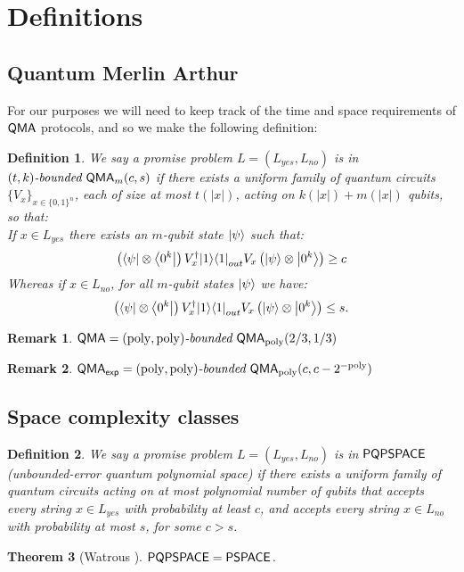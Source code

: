 \documentclass[11pt]{article}
\newtheorem{theorem}{Theorem}
\newtheorem{definition}{Definition}
\newtheorem{remark}[theorem]{Remark}
\theoremstyle{definition}
\theoremstyle{remark}
\newcommand\QMA{{\sf{QMA}}}
\newcommand\PSPACE{{\sf{PSPACE}}}
\newcommand\QMAexp{{\sf{QMA}_{exp}}}
\newcommand\bddQMA[5]{{\left(#1,#2\right)}\textit{-bounded }\QMA_{#3}(#4,#5)}
\newcommand\PQPSPACE{{\sf{PQPSPACE}}}
\newcommand{\poly}{\mathrm{poly}}
\begin{document}
\section{Definitions}

\subsection{Quantum Merlin Arthur}\label{def:qma}
For our purposes we will need to keep track of the time and space requirements of $\QMA$ protocols, and so we make the following definition:
\begin{definition}We say a promise problem $L=(L_{yes},L_{no})$ is in $\bddQMA{t}{k}{m}{c}{s}$ if there exists a uniform family of quantum circuits $\{ V_x\}_{x\in\{0,1\}^n}$, each of size at most $t(|x|)$, acting on $k(|x|)+m(|x|)$ qubits, so that:\\

If $x \in L_{yes}$ there exists an $m$-qubit state ${\left\vert{\psi}\right\rangle}$ such that:
\begin{equation}
\left({\left\langle{\psi}\right\vert}\otimes {\left\langle{0^k}\right\vert}\right) V^\dagger_x {\left\vert{1}\right\rangle}{\left\langle{1}\right\vert}_{out} V_x \left({\left\vert{\psi}\right\rangle}\otimes {\left\vert{0^k}\right\rangle}\right) \ge c
\end{equation}
Whereas if $x \in L_{no}$, for all $m$-qubit states ${\left\vert{\psi}\right\rangle}$ we have:
\begin{equation}
\left({\left\langle{\psi}\right\vert}\otimes {\left\langle{0^k}\right\vert}\right) V^\dagger_x {\left\vert{1}\right\rangle}{\left\langle{1}\right\vert}_{out} V_x \left({\left\vert{\psi}\right\rangle}\otimes {\left\vert{0^k}\right\rangle}\right) \le s.
\end{equation}

  \end{definition}

\begin{remark} $\QMA=\bddQMA{\poly}{\poly}{\poly}{2/3}{1/3}$\end{remark}
\begin{remark} $\QMAexp=\bddQMA{\poly}{\poly}{\poly}{c}{c-2^{-\poly}}$	
\end{remark}

\subsection{Space complexity classes}
\begin{definition}We say a promise problem $L=(L_{yes},L_{no})$ is in $\PQPSPACE$ (unbounded-error quantum polynomial space) if there exists a uniform family of quantum circuits acting on at most polynomial number of qubits that accepts every string $x\in L_{yes}$ with probability at least $c$, and accepts every string $x \in L_{no}$ with probability at most $s$, for some $c > s$.
	
\end{definition}
\begin{theorem}[Watrous \cite{Watrous99,Watrous03}]\label{thm:pqpspace} $\PQPSPACE=\PSPACE$.	
\end{theorem}
\end{document}
